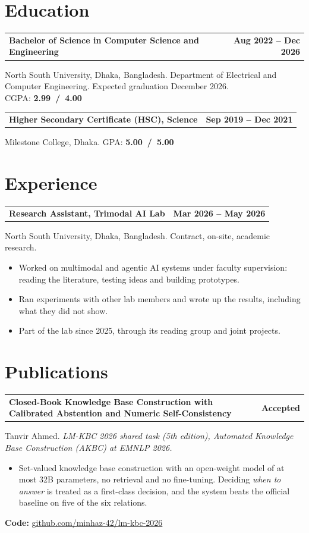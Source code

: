 \documentclass[10pt,letterpaper]{article}
\makeatletter
\newcommand{\entryhead}[2]{\par\needspace{4\baselineskip}\vspace{4pt}\noindent%
  \begin{tabular*}{\textwidth}[t]{@{}>{\raggedright\arraybackslash}p{0.72\textwidth}@{\extracolsep{\fill}}r@{}}
    \textbf{#1} & #2
  \end{tabular*}\par\vspace{1pt}}
\newcommand{\entry}[2]{\entryhead{#1}{\textbf{#2}}}
\newcommand{\code}[1]{\par\vspace{2pt}\noindent\textbf{Code:} #1\par}
\newcommand{\gap}{\par\vspace{7pt}}
\let\origsection\section
\renewcommand{\section}[1]{\needspace{7\baselineskip}\origsection{#1}}
\makeatother
\begin{document}
\section{Education}
\entry{Bachelor of Science in Computer Science and Engineering}{Aug 2022 -- Dec 2026}
North South University, Dhaka, Bangladesh. Department of Electrical and Computer Engineering.
Expected graduation December 2026.\\
CGPA: \mbox{\textbf{2.99 / 4.00}}
\gap

\entry{Higher Secondary Certificate (HSC), Science}{Sep 2019 -- Dec 2021}
Milestone College, Dhaka. GPA: \mbox{\textbf{5.00 / 5.00}}


\section{Experience}
\entry{Research Assistant, Trimodal AI Lab}{Mar 2026 -- May 2026}
North South University, Dhaka, Bangladesh. Contract, on-site, academic research.
\begin{itemize}
  \item Worked on multimodal and agentic AI systems under faculty supervision: reading the
    literature, testing ideas and building prototypes.
  \item Ran experiments with other lab members and wrote up the results, including what they did
    not show.
  \item Part of the lab since 2025, through its reading group and joint projects.
\end{itemize}

\section{Publications}

\entry{Closed-Book Knowledge Base Construction with Calibrated Abstention and Numeric Self-Consistency}{Accepted}
Tanvir Ahmed. \textit{LM-KBC 2026 shared task (5th edition), Automated Knowledge Base Construction
(AKBC) at EMNLP 2026.}
\begin{itemize}
  \item Set-valued knowledge base construction with an open-weight model of at most 32B parameters,
    no retrieval and no fine-tuning. Deciding \textit{when to answer} is treated as a first-class
    decision, and the system beats the official baseline on five of the six relations.
\end{itemize}
\code{\href{https://github.com/minhaz-42/lm-kbc-2026}{github.com/minhaz-42/lm-kbc-2026}}
\gap
\end{document}
